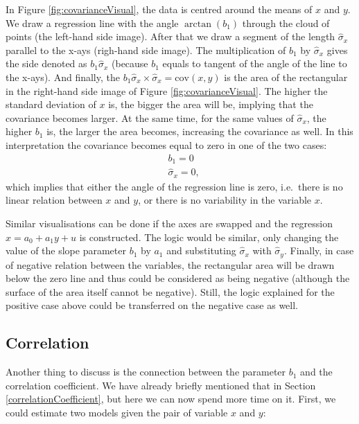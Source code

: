 \documentclass[
]{book}
\theoremstyle{definition}
\theoremstyle{definition}
\theoremstyle{definition}
\theoremstyle{definition}
\theoremstyle{remark}
\begin{document}
In Figure \ref{fig:covarianceVisual}, the data is centred around the means of \(x\) and \(y\). We draw a regression line with the angle \(\arctan (b_1)\) through the cloud of points (the left-hand side image). After that we draw a segment of the length \(\hat{\sigma}_x\) parallel to the x-ays (righ-hand side image). The multiplication of \(b_1\) by \(\hat{\sigma}_x\) gives the side denoted as \(b_1 \hat{\sigma}_x\) (because \(b_1\) equals to tangent of the angle of the line to the x-ays). And finally, the \(b_1 \hat{\sigma}_x \times \hat{\sigma}_x = \mathrm{cov}(x,y)\) is the area of the rectangular in the right-hand side image of Figure \ref{fig:covarianceVisual}. The higher the standard deviation of \(x\) is, the bigger the area will be, implying that the covariance becomes larger. At the same time, for the same values of \(\hat{\sigma}_x\), the higher \(b_1\) is, the larger the area becomes, increasing the covariance as well. In this interpretation the covariance becomes equal to zero in one of the two cases:
\begin{equation*}
    \begin{aligned}
        & {b}_1 = 0 \\
        & \hat{\sigma}_x =0 ,
    \end{aligned}
\end{equation*}
which implies that either the angle of the regression line is zero, i.e.~there is no linear relation between \(x\) and \(y\), or there is no variability in the variable \(x\).

Similar visualisations can be done if the axes are swapped and the regression \(x = a_0 + a_1 y + u\) is constructed. The logic would be similar, only changing the value of the slope parameter \(b_1\) by \(a_1\) and substituting \(\hat{\sigma}_x\) with \(\hat{\sigma}_y\). Finally, in case of negative relation between the variables, the rectangular area will be drawn below the zero line and thus could be considered as being negative (although the surface of the area itself cannot be negative). Still, the logic explained for the positive case above could be transferred on the negative case as well.

\subsection{Correlation}\label{SLRCovarianceCor}

Another thing to discuss is the connection between the parameter \({b}_1\) and the correlation coefficient. We have already briefly mentioned that in Section \ref{correlationCoefficient}, but here we can now spend more time on it. First, we could estimate two models given the pair of variable \(x\) and \(y\):
\end{document}
